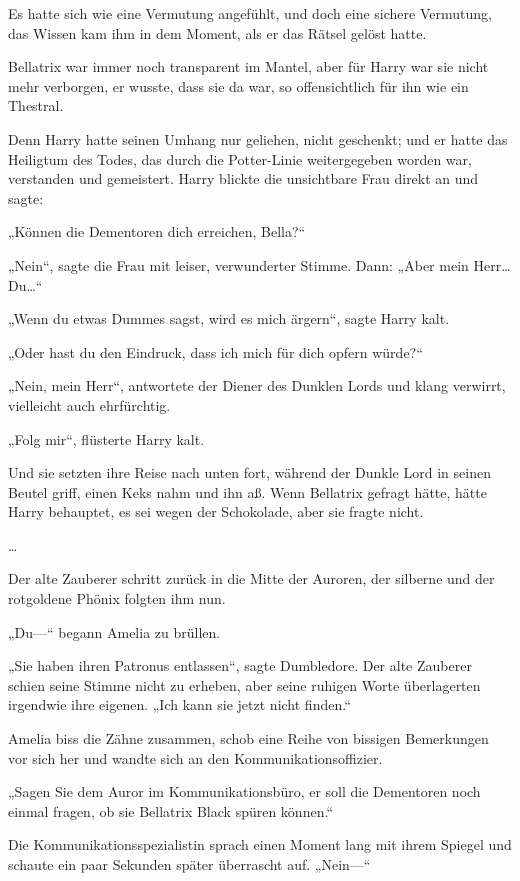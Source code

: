 {Es hatte sich wie eine Vermutung angefühlt, und doch eine sichere Vermutung, das Wissen kam ihm in dem Moment, als er das Rätsel gelöst hatte.

Bellatrix war immer noch transparent im Mantel, aber für Harry war sie nicht mehr verborgen, er wusste, dass sie da war, so offensichtlich für ihn wie ein Thestral.

Denn Harry hatte seinen Umhang nur geliehen, nicht geschenkt; und er hatte das Heiligtum des Todes, das durch die Potter-Linie weitergegeben worden war, verstanden und gemeistert. Harry blickte die unsichtbare Frau direkt an und sagte:

„Können die Dementoren dich erreichen, Bella?“

„Nein“, sagte die Frau mit leiser, verwunderter Stimme. Dann: „Aber mein Herr… Du…“

„Wenn du etwas Dummes sagst, wird es mich ärgern“, sagte Harry kalt.

„Oder hast du den Eindruck, dass ich mich für dich opfern würde?“

„Nein, mein Herr“, antwortete der Diener des Dunklen Lords und klang verwirrt, vielleicht auch ehrfürchtig.

„Folg mir“, flüsterte Harry kalt.

Und sie setzten ihre Reise nach unten fort, während der Dunkle Lord in seinen Beutel griff, einen Keks nahm und ihn aß. Wenn Bellatrix gefragt hätte, hätte Harry behauptet, es sei wegen der Schokolade, aber sie fragte nicht.

…

Der alte Zauberer schritt zurück in die Mitte der Auroren, der silberne und der rotgoldene Phönix folgten ihm nun.

„Du—“ begann Amelia zu brüllen.

„Sie haben ihren Patronus entlassen“, sagte Dumbledore. Der alte Zauberer schien seine Stimme nicht zu erheben, aber seine ruhigen Worte überlagerten irgendwie ihre eigenen. „Ich kann sie jetzt nicht finden.“

Amelia biss die Zähne zusammen, schob eine Reihe von bissigen Bemerkungen vor sich her und wandte sich an den Kommunikationsoffizier.

„Sagen Sie dem Auror im Kommunikationsbüro, er soll die Dementoren noch einmal fragen, ob sie Bellatrix Black spüren können.“

Die Kommunikationsspezialistin sprach einen Moment lang mit ihrem Spiegel und schaute ein paar Sekunden später überrascht auf. „Nein—“

}
